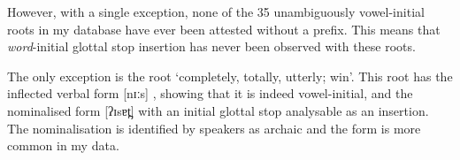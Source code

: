 \begin{exe}
	\label{ex:GloIniRoo}
	\label{ex:VowIniRoo}
\end{exe}

However, with a single exception, none of the 35 unambiguously
vowel-initial roots in my database have ever been attested without a prefix.
This means that \emph{word}-initial glottal stop
insertion has never been observed with these roots.

The only exception is the root  `completely, totally, utterly; win'.
This root has the inflected verbal form  {\ra}  [nɪːs] {},
showing that it is indeed vowel-initial, and the nominalised form
 [ʔɪsɐt̪] {} with an initial glottal stop analysable as an insertion.
The nominalisation  is identified by speakers
as archaic and the form  is more common in my data.

